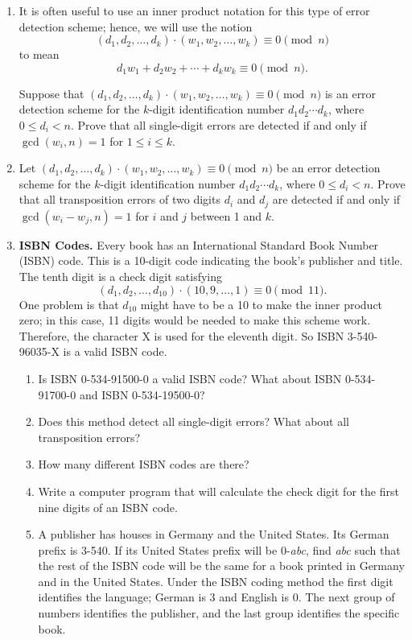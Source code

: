 {\begin{enumerate}
\item
It is often useful to use an inner product notation for this type of error detection scheme; hence, we will use the notion
\[
(d_1, d_2, \ldots, d_k ) \cdot (w_1, w_2, \ldots, w_k ) \equiv 0 \pmod{ n }
\]
to mean
\[
d_1 w_1 +  d_2 w_2 + \cdots +  d_k w_k  \equiv 0  \pmod{ n}.
\]

Suppose that $(d_1, d_2, \ldots, d_k ) \cdot (w_1, w_2, \ldots, w_k ) \equiv 0 \pmod{ n}$ is an error detection scheme for the $k$-digit identification number $d_1 d_2 \cdots d_k$, where $0 \leq d_i < n$.  Prove that all single-digit errors are detected if and only if $\gcd( w_i, n ) = 1$ for  $1 \leq i \leq k$. 

\item
Let $(d_1, d_2, \ldots, d_k ) \cdot (w_1, w_2, \ldots, w_k ) \equiv 0 \pmod{ n}$ be an error detection scheme for the $k$-digit identification number $d_1 d_2 \cdots d_k$, where $0 \leq d_i < n$.  Prove that all transposition errors of two digits $d_i$ and $d_j$ are detected if and only if $\gcd( w_i - w_j, n ) = 1$ for $i$ and  $j$ between 1 and $k$. 

\item
{\bf ISBN Codes.} 
Every book has an International Standard Book Number (ISBN) code.  This is a 10-digit code indicating the book's publisher and title.  The tenth digit is a check digit satisfying 
\[
(d_1, d_2, \ldots, d_{10} ) \cdot (10, 9, \ldots, 1 )  \equiv 0 \pmod{11}.
\]
One problem is that $d_{10}$ might have to be a 10 to make the inner product zero; in this case, 11 digits would be  needed to make this scheme work.  Therefore, the character X is used for the eleventh digit.  So ISBN 3-540-96035-X is a valid ISBN code. 
\begin{enumerate}
 
 \item
Is ISBN 0-534-91500-0 a valid ISBN code?  What about ISBN 0-534-91700-0 and ISBN 0-534-19500-0? 
 
 \item
Does this method detect all single-digit errors?  What about all transposition errors? 
 
 \item
How many different ISBN codes are there?
 
 \item
Write a computer program that will calculate the check digit for the first nine digits of an ISBN code. 
 
 \item
A publisher has houses in Germany and the United States.  Its German prefix is 3-540.  If its United States prefix will be 0-{\it abc}, find {\it abc} such that the rest of the ISBN code will be the same for a book printed in Germany and in the United States. Under the ISBN coding method the first digit identifies the language; German is  3 and English is  0.  The next group of numbers identifies the publisher, and the last group identifies the specific book. 
 
\end{enumerate}
 
\end{enumerate}
}
 
